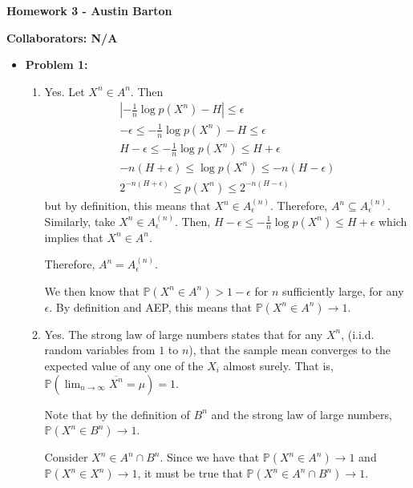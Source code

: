 \documentclass[10pt,twoside]{article}
\newcommand{\Pro}{\ensuremath{\mathbb{P}}}
\begin{document}
\begin{center}
\huge{\bf{Homework 3} - Austin Barton}
\end{center}

\medskip

\noindent \large{\textbf{Collaborators: N/A}}

\medskip

\begin{itemize}
    \item\textbf{Problem 1:} \newline
    \noindent\makebox[\linewidth]{\rule{18cm}{0.4pt}}
    \begin{enumerate}
        \item Yes. Let $X^n\in A^n$. Then 
        \begin{gather*}
            |-\frac{1}{n} \log p(X^n) - H| \leq \epsilon \\
            -\epsilon   \leq   -\frac{1}{n} \log p(X^n) - H \leq \epsilon \\
            H - \epsilon \leq -\frac{1}{n} \log p(X^n) \leq H + \epsilon \\
            -n(H + \epsilon) \leq \log p(X^n) \leq -n(H - \epsilon) \\
            2^{-n(H+\epsilon)} \leq p(X^n) \leq 2^{-n(H - \epsilon)}
        \end{gather*}
        but by definition, this means that $X^n\in A_{\epsilon}^{(n)}$. Therefore, $A^n\subseteq A_{\epsilon}^{(n)}$. Similarly, take $X^n\in  A_{\epsilon}^{(n)}$. Then, $H - \epsilon \leq -\frac{1}{n}\log p(X^n) \leq H + \epsilon$ which implies that $X^n\in A^n$. 

        Therefore, $A^n = A_{\epsilon}^{(n)}$. 

        We then know that $\Pro(X^n\in A^n) > 1 - \epsilon$ for $n$ sufficiently large, for any $\epsilon$. By definition and AEP, this means that $\Pro(X^n \in A^n) \to 1$.
        
        \item Yes. The strong law of large numbers states that for any $X^n$, (i.i.d. random variables from $1$ to $n$), that the sample mean converges to the expected value of any one of the $X_i$ almost surely. That is, $\Pro(\lim_{n\to \infty} \overline{X^n} = \mu) = 1$.
        
        Note that by the definition of $B^n$ and the strong law of large numbers, \newline
        $\Pro(X^n\in B^n)\to 1$. 

        Consider $X^n\in A^n\cap B^n$. Since we have that $\Pro(X^n\in A^n)\to 1$ and $\Pro(X^n \in X^n)\to 1$, it must be true that $\Pro(X^n\in A^n\cap B^n)\to 1$.
        

\end{enumerate}
\end{itemize}
\end{document}

